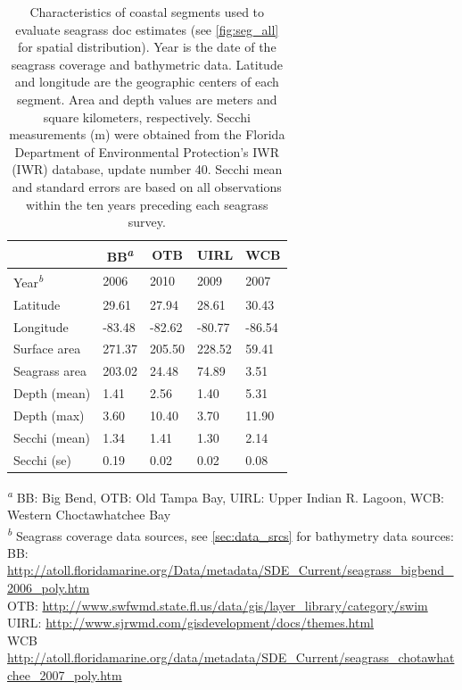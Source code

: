 \documentclass[letterpaper,12pt,oneside]{article}\usepackage[]{graphicx}\usepackage[]{color}
\begin{document}
\begin{table}[!tbp]
\caption{Characteristics of coastal segments used to evaluate seagrass \acl{doc} estimates (see \cref{fig:seg_all} for spatial distribution).  Year is the date of the seagrass coverage and bathymetric data.  Latitude and longitude are the geographic centers of each segment.  Area and depth values are meters and square kilometers, respectively.  Secchi measurements (m) were obtained from the Florida Department of Environmental Protection's \acl{IWR} (\acs{IWR}) database, update number 40.  Secchi mean and standard errors are based on all observations within the ten years preceding each seagrass survey.\label{tab:seg_summ}} 
\begin{center}
\begin{tabular}{lllll}
\hline\hline
\multicolumn{1}{l}{}&\multicolumn{1}{c}{BB\textsuperscript{\textit{a}}}&\multicolumn{1}{c}{OTB}&\multicolumn{1}{c}{UIRL}&\multicolumn{1}{c}{WCB}\tabularnewline
\hline
Year\textsuperscript{\textit{b}}&2006&2010&2009&2007\tabularnewline
Latitude& 29.61& 27.94& 28.61& 30.43\tabularnewline
Longitude&-83.48&-82.62&-80.77&-86.54\tabularnewline
Surface area&271.37&205.50&228.52& 59.41\tabularnewline
Seagrass area&203.02& 24.48& 74.89&  3.51\tabularnewline
Depth (mean)&  1.41&  2.56&  1.40&  5.31\tabularnewline
Depth (max)&  3.60& 10.40&  3.70& 11.90\tabularnewline
Secchi (mean)&  1.34&  1.41&  1.30&  2.14\tabularnewline
Secchi (se)&  0.19&  0.02&  0.02&  0.08\tabularnewline
\hline
\end{tabular}\end{center}

\footnotesize \textsuperscript{\textit{a}} BB: Big Bend, OTB: Old Tampa Bay, UIRL: Upper Indian R. Lagoon, WCB: Western Choctawhatchee Bay\\\textsuperscript{\textit{b}} Seagrass coverage data sources, see \cref{sec:data_srcs} for bathymetry data sources:\scriptsize\\BB: \url{http://atoll.floridamarine.org/Data/metadata/SDE_Current/seagrass_bigbend_2006_poly.htm}\\OTB: \url{http://www.swfwmd.state.fl.us/data/gis/layer_library/category/swim}\\UIRL: \url{http://www.sjrwmd.com/gisdevelopment/docs/themes.html}\\WCB \url{http://atoll.floridamarine.org/data/metadata/SDE_Current/seagrass_chotawhatchee_2007_poly.htm}\end{table}
\end{document}
